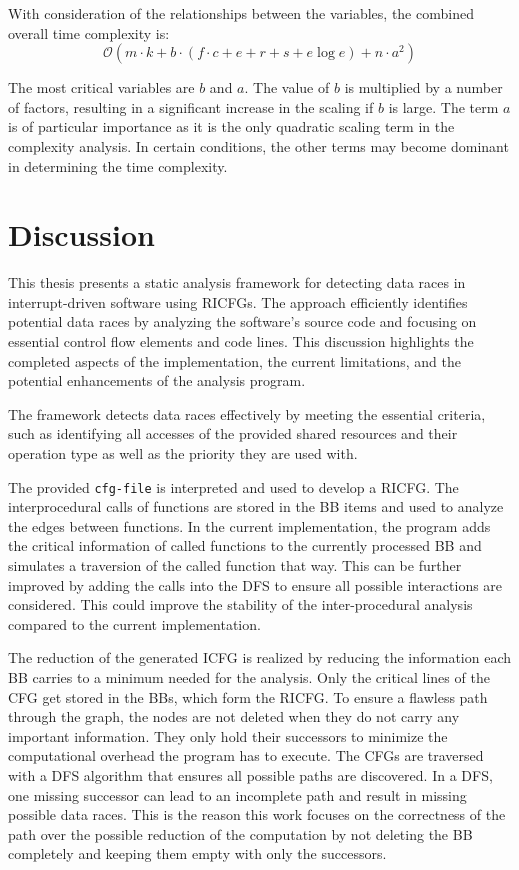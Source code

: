 \documentclass[
fancyheadings, %
%
%
]{stsreprt}
\begin{document}
{With consideration of the relationships between the variables, the combined overall time complexity is:
\[
\mathcal{O}(m \cdot k + b \cdot (f \cdot c + e + r + s + e \log e) + n \cdot a^2)
\]

The most critical variables are $b$ and $a$. The value of $b$ is multiplied by a number of factors, resulting in a significant increase in the scaling if $b$ is large. The term $a$ is of particular importance as it is the only quadratic scaling term in the complexity analysis. In certain conditions, the other terms may become dominant in determining the time complexity.

 \chapter{Discussion}
This thesis presents a static analysis framework for detecting data races in interrupt-driven software using \aclp{RICFG}. The approach efficiently identifies potential data races by analyzing the software's source code and focusing on essential control flow elements and code lines. This discussion highlights the completed aspects of the implementation, the current limitations, and the potential enhancements of the analysis program.

The framework detects data races effectively by meeting the essential criteria, such as identifying all accesses of the provided shared resources and their operation type as well as the priority they are used with.

The provided \texttt{cfg-file} is interpreted and used to develop a \acl{RICFG}. The interprocedural calls of functions are stored in the \acl{BB} items and used to analyze the edges between functions. In the current implementation, the program adds the critical information of called functions to the currently processed \ac{BB} and simulates a traversion of the called function that way. This can be further improved by adding the calls into the \ac{DFS} to ensure all possible interactions are considered. This could improve the stability of the inter-procedural analysis compared to the current implementation.

The reduction of the generated \ac{ICFG} is realized by reducing the information each \acl{BB} carries to a minimum needed for the analysis. Only the critical lines of the \ac{CFG} get stored in the \aclp{BB}, which form the \ac{RICFG}. To ensure a flawless path through the graph, the nodes are not deleted when they do not carry any important information. They only hold their successors to minimize the computational overhead the program has to execute. 
The \acp{CFG} are traversed with a \ac{DFS} algorithm that ensures all possible paths are discovered. In a \ac{DFS}, one missing successor can lead to an incomplete path and result in missing possible data races. This is the reason this work focuses on the correctness of the path over the possible reduction of the computation by not deleting the \ac{BB} completely and keeping them empty with only the successors.

}
\end{document}
